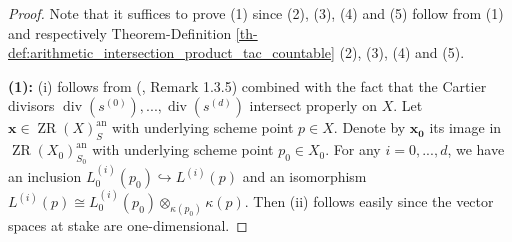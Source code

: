 \documentclass [11pt,reqno]{amsart}
\newcommand{\1}{\mathmybb{1}}
\def\an{\operatorname{an}}
\def\div{\operatorname{div}}
\def\ZR{\operatorname{ZR}}
\begin{document}
\begin{proof}
Note that it suffices to prove (1) since (2), (3), (4) and (5) follow from (1) and respectively Theorem-Definition \ref{th-def:arithmetic_intersection_product_tac_countable} (2), (3), (4) and (5).  

\textbf{(1):} (i) follows from (\cite{ChenMori21}, Remark 1.3.5) combined with the fact that the Cartier divisors $\div(s^{(0)}),...,\div(s^{(d)})$ intersect properly on $X$. Let $\mathbf{x}\in\ZR(X)^{\an}_{S}$ with underlying scheme point $p\in X$. Denote by $\mathbf{x_{0}}$ its image in $\ZR(X_{0})_{S_{0}}^{\an}$ with underlying scheme point $p_{0}\in X_{0}$. For any $i=0,...,d$, we have an inclusion $L^{(i)}_{0}(p_{0})\hookrightarrow L^{(i)}(p)$ and an isomorphism $L^{(i)}(p) \cong L^{(i)}_{0}(p_{0})\otimes_{\kappa(p_{0})}\kappa(p)$. Then (ii) follows easily since the vector spaces at stake are one-dimensional. 


\end{proof}
\end{document}
